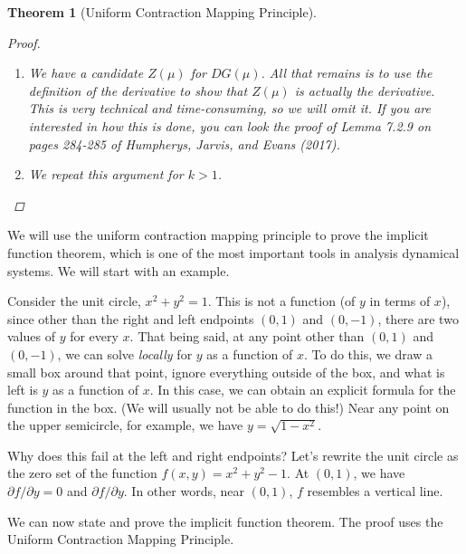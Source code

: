 \documentclass[12pt]{amsart}         %
\newtheorem{theorem}{Theorem}[section]
\theoremstyle{remark}
\begin{document}
\begin{theorem}[Uniform Contraction Mapping Principle]
\begin{proof}
\begin{enumerate}
\item We have a candidate $Z(\mu)$ for $DG(\mu)$. All that remains is to use the definition of the derivative to show that $Z(\mu)$ is actually the derivative. This is very technical and time-consuming, so we will omit it. If you are interested in how this is done, you can look the proof of Lemma 7.2.9 on pages 284-285 of Humpherys, Jarvis, and Evans (2017).

\item We repeat this argument for $k > 1$.
\end{enumerate}

\end{proof}
\end{theorem}

We will use the uniform contraction mapping principle to prove the implicit function theorem, which is one of the most important tools in analysis dynamical systems. We will start with an example.

Consider the unit circle, $x^2 + y^2 = 1$. This is not a function (of $y$ in terms of $x$), since other than the right and left endpoints $(0, 1)$ and $(0, -1)$, there are two values of $y$ for every $x$. That being said, at any point other than $(0, 1)$ and $(0, -1)$, we can solve \emph{locally} for $y$ as a function of $x$. To do this, we draw a small box around that point, ignore everything outside of the box, and what is left is $y$ as a function of $x$. In this case, we can obtain an explicit formula for the function in the box. (We will usually not be able to do this!) Near any point on the upper semicircle, for example, we have $y = \sqrt{1 - x^2}$.

Why does this fail at the left and right endpoints? Let's rewrite the unit circle as the zero set of the function $f(x, y) = x^2 + y^2 - 1$. At $(0, 1)$, we have $\partial f / \partial y = 0$ and $\partial f / \partial y$. In other words, near $(0, 1)$, $f$ resembles a vertical line.

We can now state and prove the implicit function theorem. The proof uses the Uniform Contraction Mapping Principle.
\end{document}
